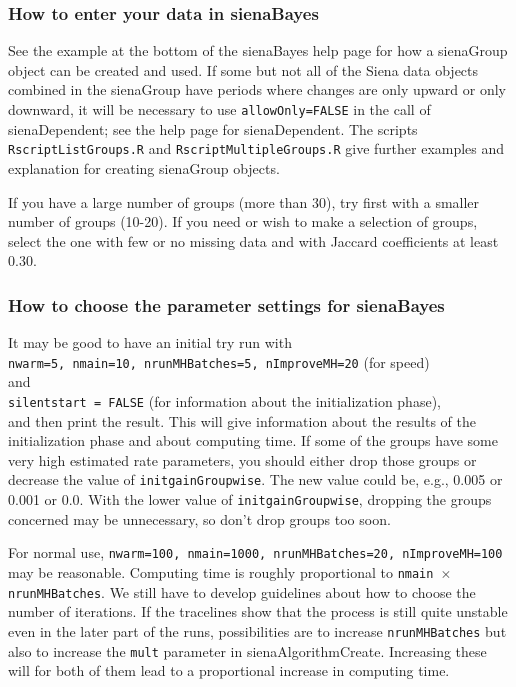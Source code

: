 \documentclass[a4paper,fleqn,11pt]{article}
\newcommand{\+}{\, + \,}
\newcommand{\sfn}[1]{\textsf{#1}}
\begin{document}
\subsubsection{How to enter your data in sienaBayes}

See the example at the bottom of the \sfn{sienaBayes} help page for how a
\sfn{sienaGroup} object can be created and used.
If some but not all of the Siena data objects combined in the \sfn{sienaGroup} have
periods where changes are only upward or only downward,
it will be necessary to use \texttt{allowOnly=FALSE} in the call of
\sfn{sienaDependent}; see the help page for \sfn{sienaDependent}.
The scripts \texttt{RscriptListGroups.R} and \texttt{RscriptMultipleGroups.R}
give further examples and explanation for creating \sfn{sienaGroup} objects.

If you have a large number of groups (more than 30), try first
with a smaller number of groups (10-20). If you need or wish to
make a selection of groups, select the one with few or no missing data and
with Jaccard coefficients at least 0.30.

\subsubsection{How to choose the parameter settings for sienaBayes}
\label{S_sienaBayesParameters}

It may be good to have an initial try run with\\
\texttt{nwarm=5, nmain=10, nrunMHBatches=5, nImproveMH=20}
(for speed) \\
and \\
\texttt{silentstart = FALSE} (for information about the
initialization phase),\\
and then \sfn{print} the result.
This will give information about the results of the initialization
phase and about computing time. If some of the groups have some very
high estimated rate parameters, you should either drop those groups
or decrease the value of \texttt{initgainGroupwise}.
The new value could be, e.g., 0.005 or 0.001 or 0.0. With the lower value
of \texttt{initgainGroupwise}, dropping the groups concerned may be unnecessary,
so don't drop groups too soon.

For normal use, \texttt{nwarm=100, nmain=1000, nrunMHBatches=20, nImproveMH=100}
may be reasonable.
Computing time is roughly proportional to
\texttt{nmain $\times$ nrunMHBatches}.
We still have to develop guidelines about how to choose the number of
iterations. If the tracelines show that the process is still quite
unstable even in the later part of the runs, possibilities are to
increase \texttt{nrunMHBatches} but also to increase the \texttt{mult} parameter in
\sfn{sienaAlgorithmCreate}. Increasing these will for both of them lead to
a proportional increase in computing time.
\end{document}
